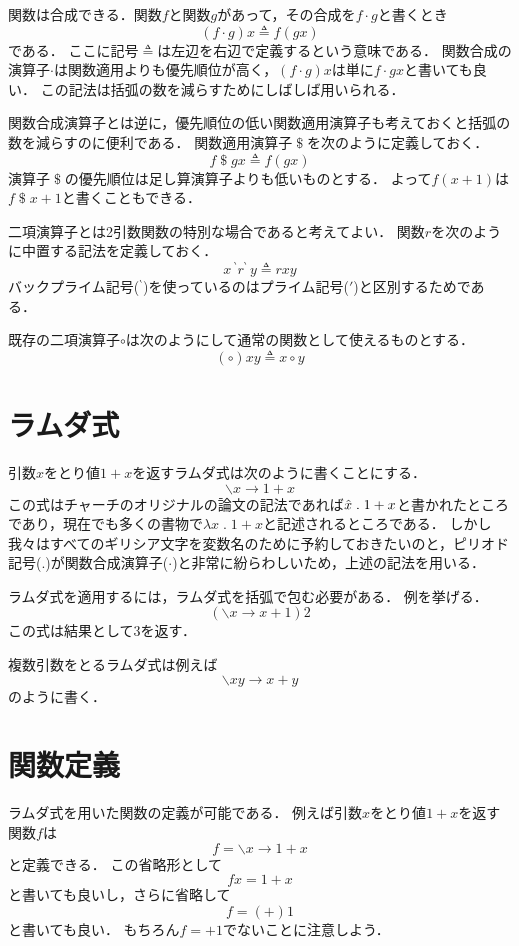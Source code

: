 \documentclass[twocolumn]{jsbook}
\newcommand{\dollar}{\mathop{\$}}
\newcommand{\lambdaperiod}{\;.\;}
\begin{document}
関数は合成できる．関数$f$と関数$g$があって，その合成を$f\cdot g$と書くとき$$(f\cdot g)x\triangleq f(gx)$$である．
ここに記号$\triangleq$は左辺を右辺で定義するという意味である．
関数合成の演算子$\cdot$は関数適用よりも優先順位が高く，$(f\cdot g)x$は単に$f\cdot gx$と書いても良い．
この記法は括弧の数を減らすためにしばしば用いられる．

関数合成演算子とは逆に，優先順位の低い関数適用演算子も考えておくと括弧の数を減らすのに便利である．
関数適用演算子$\dollar$を次のように定義しておく．
$$f\dollar gx\triangleq f(gx)$$
演算子$\dollar$の優先順位は足し算演算子よりも低いものとする．
よって$f(x+1)$は$f\dollar x+1$と書くこともできる．

二項演算子とは2引数関数の特別な場合であると考えてよい．
関数$r$を次のように中置する記法を定義しておく．
$$x\,{}^\backprime r^\backprime\,y\triangleq rxy$$
バックプライム記号(${}^\backprime$)を使っているのはプライム記号($'$)と区別するためである．

既存の二項演算子$\circ$は次のようにして通常の関数として使えるものとする．
$$(\circ)xy\triangleq x\circ y$$

\section{ラムダ式}

引数$x$をとり値$1+x$を返すラムダ式は次のように書くことにする．
$$\backslash x\rightarrow 1+x$$
この式はチャーチのオリジナルの論文の記法であれば$\Hat x\lambdaperiod 1+x$と書かれたところであり，現在でも多くの書物で$\lambda x\lambdaperiod 1+x$と記述されるところである．
しかし我々はすべてのギリシア文字を変数名のために予約しておきたいのと，ピリオド記号($.$)が関数合成演算子($\cdot$)と非常に紛らわしいため，上述の記法を用いる．

ラムダ式を適用するには，ラムダ式を括弧で包む必要がある．
例を挙げる．
$$\left(\backslash x\rightarrow x+1\right)2$$
この式は結果として$3$を返す．

複数引数をとるラムダ式は例えば$$\backslash xy\rightarrow x+y$$のように書く．

\section{関数定義}

ラムダ式を用いた関数の定義が可能である．
例えば引数$x$をとり値$1+x$を返す関数$f$は$$f=\backslash x\rightarrow 1+x$$と定義できる．
この省略形として$$fx=1+x$$と書いても良いし，さらに省略して$$f=(+)1$$と書いても良い．
もちろん$f=+1$でないことに注意しよう．
\end{document}
